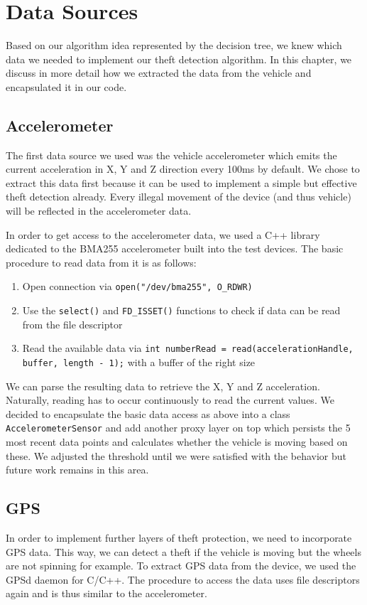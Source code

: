 \section{Data Sources}

Based on our algorithm idea represented by the decision tree, we knew which data we needed to implement our theft detection algorithm. In this chapter, we discuss in more detail how we extracted the data from the vehicle and encapsulated it in our code.

\subsection{Accelerometer}
The first data source we used was the vehicle accelerometer which emits the current acceleration in X, Y and Z direction every 100ms by default. We chose to extract this data first because it can be used to implement a simple but effective theft detection already. Every illegal movement of the device (and thus vehicle) will be reflected in the accelerometer data.

In order to get access to the accelerometer data, we used a C++ library dedicated to the BMA255 accelerometer \cite{BMA255} built into the test devices. The basic procedure to read data from it is as follows:

\begin{enumerate}
	\item Open connection via \texttt{open("/dev/bma255", O\_RDWR)}
	\item Use the \texttt{select()} and \texttt{FD\_ISSET()} functions to check if data can be read from the file descriptor
	\item Read the available data via \texttt{int numberRead = read(accelerationHandle, buffer, length - 1);} with a buffer of the right size
\end{enumerate}

We can parse the resulting data to retrieve the X, Y and Z acceleration. Naturally, reading has to occur continuously to read the current values. We decided to encapsulate the basic data access as above into a class \texttt{AccelerometerSensor} and add another proxy layer on top which persists the 5 most recent data points and calculates whether the vehicle is moving based on these. We adjusted the threshold until we were satisfied with the behavior but future work remains in this area.

\subsection{GPS}
In order to implement further layers of theft protection, we need to incorporate GPS data. This way, we can detect a theft if the vehicle is moving but the wheels are not spinning for example. To extract GPS data from the device, we used the GPSd daemon \cite{GPSd} for C/C++. The procedure to access the data uses file descriptors again and is thus similar to the accelerometer.

